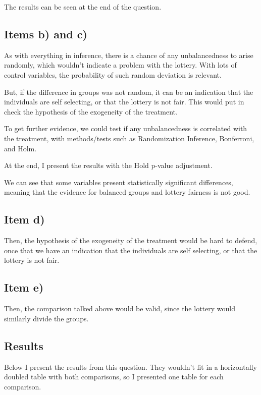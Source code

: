 \documentclass[
]{article}
\begin{document}
The results can be seen at the end of the question.

\subsection{Items b) and c)}\label{items-b-and-c}

As with everything in inference, there is a chance of any unbalancedness
to arise randomly, which wouldn't indicate a problem with the lottery.
With lots of control variables, the probability of such random deviation
is relevant.

But, if the difference in groups was not random, it can be an indication
that the individuals are self selecting, or that the lottery is not
fair. This would put in check the hypothesis of the exogeneity of the
treatment.

To get further evidence, we could test if any unbalancedness is
correlated with the treatment, with methods/tests such as Randomization
Inference, Bonferroni, and Holm.

At the end, I present the results with the Hold p-value adjustment.

We can see that some variables present statistically significant
differences, meaning that the evidence for balanced groups and lottery
fairness is not good.

\subsection{Item d)}\label{item-d}

Then, the hypothesis of the exogeneity of the treatment would be hard to
defend, once that we have an indication that the individuals are self
selecting, or that the lottery is not fair.

\subsection{Item e)}\label{item-e}

Then, the comparison talked above would be valid, since the lottery
would similarly divide the groups.

\subsection{Results}\label{results}

Below I present the results from this question. They wouldn't fit in a
horizontally doubled table with both comparisons, so I presented one
table for each comparison.
\end{document}
